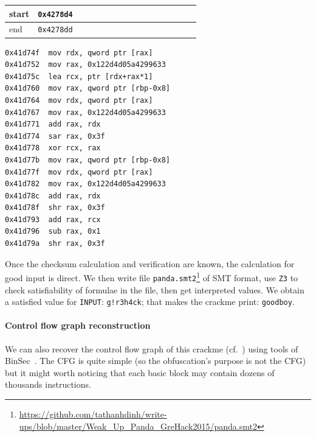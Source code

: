 \documentclass{easychair}
\begin{document}
\begin{table}[h]
  \centering
  \begin{tabular}{ | l | c | c | c | c | c | c | c | c | c | c | c | c | c | c | c |}
    \hline
    start & \texttt{0x4278d4} & \\ \hline
    end & \texttt{0x4278dd} & \\ \hline
  \end{tabular}
\end{table}

\begin{lstlisting}[frame=lines, caption={Instructions verifying checksum}, captionpos=b, boxpos=b, language={[x86masm]Assembler}, label=lst:checksumverificationcode]
0x41d74f  mov rdx, qword ptr [rax]
0x41d752  mov rax, 0x122d4d05a4299633
0x41d75c  lea rcx, ptr [rdx+rax*1]
0x41d760  mov rax, qword ptr [rbp-0x8]
0x41d764  mov rdx, qword ptr [rax]
0x41d767  mov rax, 0x122d4d05a4299633
0x41d771  add rax, rdx
0x41d774  sar rax, 0x3f
0x41d778  xor rcx, rax
0x41d77b  mov rax, qword ptr [rbp-0x8]
0x41d77f  mov rdx, qword ptr [rax]
0x41d782  mov rax, 0x122d4d05a4299633
0x41d78c  add rax, rdx
0x41d78f  shr rax, 0x3f
0x41d793  add rax, rcx
0x41d796  sub rax, 0x1
0x41d79a  shr rax, 0x3f
\end{lstlisting}

Once the checksum calculation and verification are known, the calculation for good input is direct. We then write file \texttt{panda.smt2}\footnote{\url{https://github.com/tathanhdinh/write-ups/blob/master/Weak\_Up\_Panda\_GreHack2015/panda.smt2}} of SMT format, use \texttt{Z3} to check satisfiability of formulae in the file, then get interpreted values. We obtain a satisfied value for \texttt{INPUT}: \texttt{g!r3h4ck}; that makes the crackme print: \texttt{goodboy}.

\paragraph{Control flow graph reconstruction}
We can also recover the control flow graph of this crackme (cf.~) using tools of BinSec~\autocite{binsec}. The CFG is quite simple (so the obfuscation's purpose is not the CFG) but it might worth noticing that each basic block may contain dozens of thousands instructions.
\end{document}
